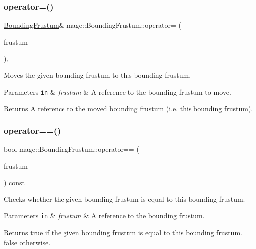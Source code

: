 \subsubsection{\texorpdfstring{operator=()}{operator=()}\hspace{0.1cm}{\footnotesize\ttfamily [2/2]}}
{\footnotesize\ttfamily \mbox{\hyperlink{classmage_1_1_bounding_frustum}{Bounding\+Frustum}}\& mage\+::\+Bounding\+Frustum\+::operator= (\begin{DoxyParamCaption}\item[{\mbox{\hyperlink{classmage_1_1_bounding_frustum}{Bounding\+Frustum}} \&\&}]{frustum }\end{DoxyParamCaption})\hspace{0.3cm}{\ttfamily [default]}, {\ttfamily [noexcept]}}

Moves the given bounding frustum to this bounding frustum.


\begin{DoxyParams}[1]{Parameters}
\mbox{\tt in}  & {\em frustum} & A reference to the bounding frustum to move. \\
\hline
\end{DoxyParams}
\begin{DoxyReturn}{Returns}
A reference to the moved bounding frustum (i.\+e. this bounding frustum). 
\end{DoxyReturn}
\mbox{\label{classmage_1_1_bounding_frustum_a90c5a355878674b1320e195318703d4b}} 
\subsubsection{\texorpdfstring{operator==()}{operator==()}}
{\footnotesize\ttfamily bool mage\+::\+Bounding\+Frustum\+::operator== (\begin{DoxyParamCaption}\item[{const \mbox{\hyperlink{classmage_1_1_bounding_frustum}{Bounding\+Frustum}} \&}]{frustum }\end{DoxyParamCaption}) const\hspace{0.3cm}{\ttfamily [noexcept]}}

Checks whether the given bounding frustum is equal to this bounding frustum.


\begin{DoxyParams}[1]{Parameters}
\mbox{\tt in}  & {\em frustum} & A reference to the bounding frustum. \\
\hline
\end{DoxyParams}
\begin{DoxyReturn}{Returns}
{\ttfamily true} if the given bounding frustum is equal to this bounding frustum. {\ttfamily false} otherwise. 
\end{DoxyReturn}
\mbox{\label{classmage_1_1_bounding_frustum_a0fbd4639f1bd0a014430313410aa013d}} 
